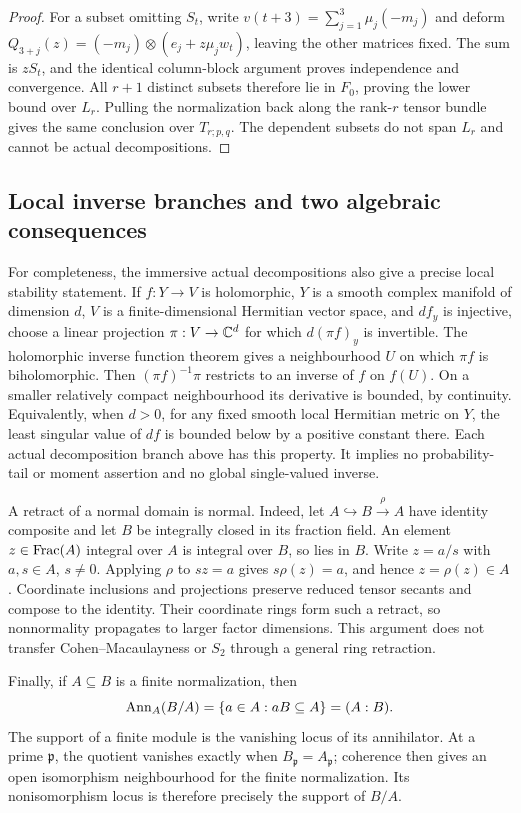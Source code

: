 \begin{proof}
For a subset omitting $S_t$, write
$v(t+3)=\sum_{j=1}^3\mu_j(-m_j)$ and deform
$Q_{3+j}(z)=(-m_j)\otimes(e_j+z\mu_jw_t)$, leaving the
other matrices fixed. The sum is $zS_t$, and the identical
column-block argument proves independence and convergence.
All $r+1$ distinct subsets therefore lie in $F_0$, proving
the lower bound over $L_r$. Pulling the normalization back
along the rank-$r$ tensor bundle gives the same conclusion
over $T_{r;p,q}$. The dependent subsets do not span $L_r$
and cannot be actual decompositions.
\end{proof}





\subsection{Local inverse branches and two algebraic consequences}

For completeness, the immersive actual decompositions also give a
precise local stability statement. If $f:Y\to V$ is holomorphic,
$Y$ is a smooth complex manifold of dimension $d$, $V$ is a
finite-dimensional Hermitian vector space, and $df_y$ is injective,
choose a linear projection $\pi:V\to\mathbb C^d$ for which
$d(\pi f)_y$ is invertible. The holomorphic inverse function
theorem gives a neighbourhood $U$ on which $\pi f$ is
biholomorphic. Then $(\pi f)^{-1}\pi$ restricts to an inverse
of $f$ on $f(U)$. On a smaller relatively compact neighbourhood
its derivative is bounded, by continuity. Equivalently, when $d>0$,
for any fixed smooth local Hermitian metric on $Y$, the least
singular value of $df$ is bounded below by a positive constant
there. Each actual decomposition branch above has this property.
It implies no probability-tail or moment assertion and no global
single-valued inverse.

A retract of a normal domain is normal. Indeed, let
$A\hookrightarrow B\xrightarrow{\rho}A$ have identity composite
and let $B$ be integrally closed in its fraction field. An
element $z\in\operatorname{Frac}(A)$ integral over $A$ is integral over $B$,
so lies in $B$. Write $z=a/s$ with $a,s\in A$, $s\ne0$.
Applying $\rho$ to $sz=a$ gives $s\rho(z)=a$, and hence
$z=\rho(z)\in A$. Coordinate inclusions and projections
preserve reduced tensor secants and compose to the identity.
Their coordinate rings form such a retract, so nonnormality
propagates to larger factor dimensions. This argument does
not transfer Cohen--Macaulayness or $S_2$ through a general
ring retraction.

Finally, if $A\subseteq B$ is a finite normalization, then
\[
 \operatorname{Ann}_A(B/A)=\{a\in A:aB\subseteq A\}=(A:B).
\]
The support of a finite module is the vanishing locus of its
annihilator. At a prime $\mathfrak p$, the quotient vanishes
exactly when $B_{\mathfrak p}=A_{\mathfrak p}$; coherence
then gives an open isomorphism neighbourhood for the finite
normalization. Its nonisomorphism locus is therefore precisely
the support of $B/A$.

